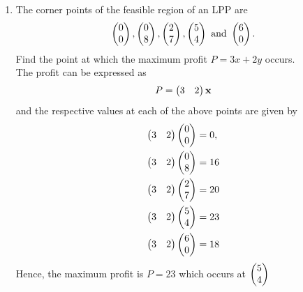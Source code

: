 \documentclass[journal,12pt,twocolumn]{IEEEtran}
\renewcommand\thesection{\arabic{section}}
\begin{document}
\begin{enumerate}[label=\thesection.\arabic*.,ref=\thesection.\theenumi]
\item  The corner points of the feasible region of an LPP are 
\begin{align}
	\begin{pmatrix}0\\0\end{pmatrix},\begin{pmatrix}0\\8\end{pmatrix},\begin{pmatrix}2\\7\end{pmatrix},\begin{pmatrix}5\\4\end{pmatrix} \text{ and } \begin{pmatrix}6\\0\end{pmatrix}. 
    \end{align}
	Find the point at which the maximum profit $P=3x+2y$ occurs. 
	\\
	\solution The profit can be expressed as
\begin{align}
	P=\begin{pmatrix}3  & 2\end{pmatrix} \mathbf{x}
    \end{align}
    and the respective values at each of the above points are given by 
\begin{align}
	\begin{pmatrix}3  & 2\end{pmatrix}\begin{pmatrix}0\\0\end{pmatrix} &= 0,
	\\
	\begin{pmatrix}3  & 2\end{pmatrix}\begin{pmatrix}0\\8\end{pmatrix} & = 16
	\\
	\begin{pmatrix}3  & 2\end{pmatrix}\begin{pmatrix}2\\7\end{pmatrix} &= 20
	\\
	\begin{pmatrix}3  & 2\end{pmatrix}\begin{pmatrix}5\\4\end{pmatrix} &= 23
	\\
	\begin{pmatrix}3  & 2\end{pmatrix} \begin{pmatrix}6\\0\end{pmatrix} &= 18 
    \end{align}
    Hence, the maximum profit is $P = 23$ which occurs at $\begin{pmatrix}5\\4\end{pmatrix}$
\end{enumerate}
\end{document}

